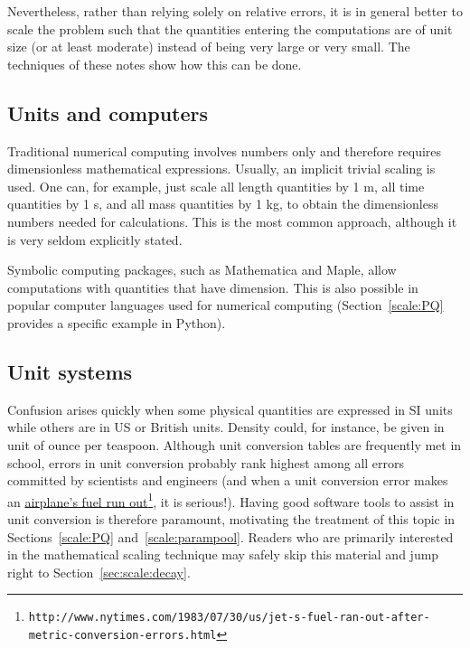 \documentclass[graybox,envcountchap,sectrefs,final]{svmonodo}
\begin{document}
Nevertheless, rather than relying solely on relative errors, it is in general
better to scale the problem such that the quantities entering the
computations are of unit size (or at least moderate) instead of being very
large or very small. The techniques of these notes show how this
can be done.

\subsection{Units and computers}

Traditional numerical computing involves numbers only and therefore
requires dimensionless mathematical expressions. Usually, an implicit
trivial scaling is used. One can, for example, just scale all length
quantities by 1 m, all time quantities by 1 s, and all mass quantities
by 1 kg, to obtain the dimensionless numbers needed for calculations.
This is the most common approach, although it is very seldom explicitly
stated.

Symbolic computing packages, such as Mathematica and Maple, allow
computations with quantities that have dimension. This is also possible
in popular computer languages used for numerical computing (Section~\ref{scale:PQ} provides a specific example in Python).


\subsection{Unit systems}


Confusion arises quickly when some physical quantities are expressed
in SI units while others are in US or British units.  Density could,
for instance, be given in unit of ounce per
teaspoon.
Although unit conversion tables are
frequently met in school, errors in unit conversion probably rank
highest among all errors committed by scientists and engineers (and
when a unit conversion error makes an \href{{http://www.nytimes.com/1983/07/30/us/jet-s-fuel-ran-out-after-metric-conversion-errors.html}}{airplane's fuel run out}\footnote{\texttt{http://www.nytimes.com/1983/07/30/us/jet-s-fuel-ran-out-after-metric-conversion-errors.html}},
it is serious!).  Having good software tools to assist in unit
conversion is therefore paramount, motivating the treatment of this
topic in Sections~\ref{scale:PQ} and~\ref{scale:parampool}.  Readers who
are primarily interested in the mathematical scaling technique may
safely skip this material and jump right to Section~\ref{sec:scale:decay}.
\end{document}

